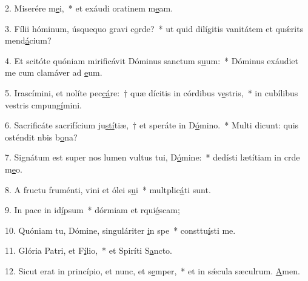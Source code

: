 2. Miserére m\uline{e}i,~* et exáudi oratinem m\uline{e}am.\par 
3. Fílii hóminum, úsquequo gravi c\uline{o}rde?~* ut quid dilígitis vanitátem et quǽrits mend\uline{á}cium?\par 
4. Et scitóte quóniam mirificávit Dóminus sanctum s\uline{u}um:~* Dóminus exáudiet me cum clamáver ad \uline{e}um.\par 
5. Irascímini, et nolíte pec\uline{cá}re:~† quæ dícitis in córdibus v\uline{e}stris,~* in cubílibus vestris cmpung\uline{í}mini.\par 
6. Sacrificáte sacrifícium ju\uline{stí}tiæ,~† et speráte in D\uline{ó}mino.~* Multi dicunt: quis osténdit nbis b\uline{o}na?\par 
7. Signátum est super nos lumen vultus tui, D\uline{ó}mine:~* dedísti lætítiam in crde m\uline{e}o.\par 
8. A fructu fruménti, vini et ólei s\uline{u}i~* multplic\uline{á}ti sunt.\par 
9. In pace in id\uline{í}psum~* dórmiam et rqui\uline{é}scam;\par 
10. Quóniam tu, Dómine, singuláriter \uline{i}n spe~* consttu\uline{í}sti me.\par 
11. Glória Patri, et F\uline{í}lio,~* et Spiríti S\uline{a}ncto.\par 
12. Sicut erat in princípio, et nunc, et s\uline{e}mper,~* et in sǽcula sæculrum. \uline{A}men.\par 
